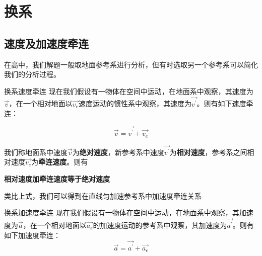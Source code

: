 \section{换系}

\subsection{速度及加速度牵连}
\label{s_sdql}

在高中，我们解题一般取地面参考系进行分析，但有时选取另一个参考系可以简化我们的分析过程。



\begin{theo}{换系速度牵连}{}
现在我们假设有一物体在空间中运动，在地面系中观察，其速度为$\vec{v}$，在一个相对地面以$\vec{v_e}$速度运动的惯性系中观察，其速度为$\vec{v^{\prime}}$。则有如下速度牵连：

$$\vec{v} = \vec{v^{\prime}} + \vec{v_e}$$

我们称地面系中速度$\vec{v}$为\textbf{绝对速度}，新参考系中速度$\vec{v^{\prime}}$为\textbf{相对速度}，参考系之间相对速度$\vec{v_e}$为\textbf{牵连速度}。则有
\begin{center}
\textbf{相对速度加牵连速度等于绝对速度}
\end{center}

\end{theo}

类比上式，我们可以得到在直线匀加速参考系中加速度牵连关系

\begin{theo}{换系加速度牵连}{}
现在我们假设有一物体在空间中运动，在地面系中观察，其加速度为$\vec{a}$，在一个相对地面以$\vec{a_e}$的加速度运动的参考系中观察，其加速度为$\vec{a^{\prime}}$。则有如下加速度牵连：
$$\vec{a} = \vec{a^{\prime}} + \vec{a_e}$$
\end{theo}

